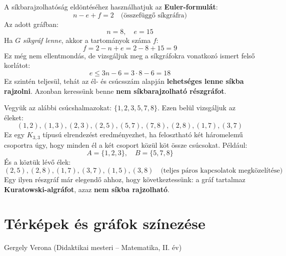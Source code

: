 \begin{solution}
	A síkbarajzolhatóság eldöntéséhez használhatjuk az \textbf{Euler-formulát}:
	\[
	n-e+f=2\quad\text{(összefüggő síkgráfra)}
	\]
	Az adott gráfban:
	\[
	n=8,\quad e=15
	\]
	Ha $G$ \emph{síkgráf lenne}, akkor a tartományok száma $f$:
	\[
	f=2-n+e=2-8+15=9
	\]
	Ez még nem ellentmondás, de vizsgáljuk meg a síkgráfokra vonatkozó
	ismert felső korlátot:
	\[
	e\leq3n-6=3\cdot8-6=18
	\]
	Ez szintén teljesül, tehát az él- és csúcsszám alapján \textbf{lehetséges
		lenne síkba rajzolni}. Azonban keressünk benne \textbf{nem síkbarajzolható
		részgráfot}.
	
	Vegyük az alábbi csúcshalmazokat: $\{1,2,3,5,7,8\}$. Ezen belül vizsgáljuk az éleket: 
	\[
	(1,2),(1,3),(2,3),(2,5),(5,7),(7,8),(2,8),(1,7),(3,7)
	\]
	Ez egy $K_{3,3}$ típusú elrendezést eredményezhet, ha felosztható
	két háromelemű csoportra úgy, hogy minden él a két csoport közül köt
	össze csúcsokat. Például:
	\[
	A=\{1,2,3\},\quad B=\{5,7,8\}
	\]
	És a köztük lévő élek:
	\[
	(2,5),(2,8),(1,7),(3,7),(1,5),(3,8)\quad\text{(teljes páros kapcsolatok megközelítése)}
	\]
	Egy ilyen részgráf már elegendő ahhoz, hogy következtessünk: a gráf
	tartalmaz \textbf{Kuratowski-algráfot}, azaz \textbf{nem síkba rajzolható}.
\end{solution}



\section{Térképek és gráfok színezése}\label{sec:terkepek}
\begin{description}
	{\large \item [{Szerző}] Gergely Verona (Didaktikai mesteri -- Matematika, II. év) }
\end{description}


